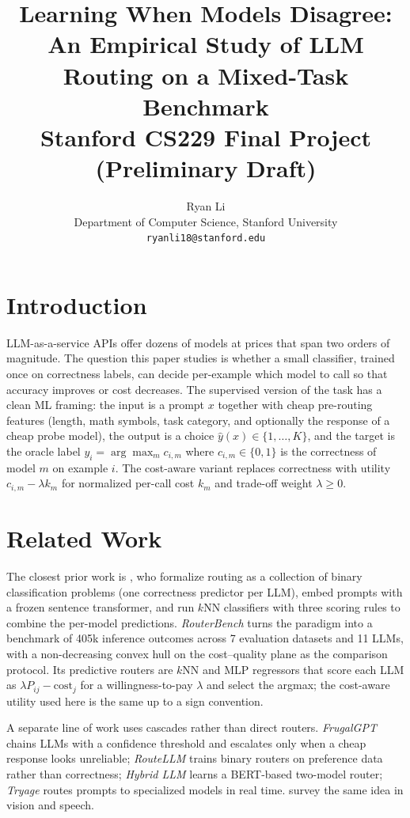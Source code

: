 \documentclass[11pt]{article}
\title{Learning When Models Disagree:\\ An Empirical Study of LLM Routing on a Mixed-Task Benchmark\\[0.3em] \large \normalfont Stanford CS229 Final Project (Preliminary Draft)}
\author{Ryan Li \\ Department of Computer Science, Stanford University \\ \texttt{ryanli18@stanford.edu}}
\date{}
\begin{document}
\maketitle

\section{Introduction}
LLM-as-a-service APIs offer dozens of models at prices that span two orders of magnitude. The question this paper studies is whether a small classifier, trained once on correctness labels, can decide per-example which model to call so that accuracy improves or cost decreases. The supervised version of the task has a clean ML framing: the input is a prompt $x$ together with cheap pre-routing features (length, math symbols, task category, and optionally the response of a cheap probe model), the output is a choice $\hat{y}(x)\in\{1,\dots,K\}$, and the target is the oracle label $y_i=\arg\max_m c_{i,m}$ where $c_{i,m}\in\{0,1\}$ is the correctness of model $m$ on example $i$. The cost-aware variant replaces correctness with utility $c_{i,m}-\lambda k_m$ for normalized per-call cost $k_m$ and trade-off weight $\lambda\geq 0$.

\section{Related Work}
The closest prior work is \citet{shnitzer2023llm}, who formalize routing as a collection of binary classification problems (one correctness predictor per LLM), embed prompts with a frozen sentence transformer, and run $k$NN classifiers with three scoring rules to combine the per-model predictions. \emph{RouterBench} \citep{routerbench} turns the paradigm into a benchmark of 405k inference outcomes across 7 evaluation datasets and 11 LLMs, with a non-decreasing convex hull on the cost--quality plane as the comparison protocol. Its predictive routers are $k$NN and MLP regressors that score each LLM as $\lambda P_{ij}-\mathrm{cost}_j$ for a willingness-to-pay $\lambda$ and select the argmax; the cost-aware utility used here is the same up to a sign convention.

A separate line of work uses cascades rather than direct routers. \emph{FrugalGPT} \citep{frugalgpt} chains LLMs with a confidence threshold and escalates only when a cheap response looks unreliable; \emph{RouteLLM} \citep{routellm} trains binary routers on preference data rather than correctness; \emph{Hybrid LLM} \citep{hybridllm} learns a BERT-based two-model router; \emph{Tryage} \citep{forcrouter} routes prompts to specialized models in real time. \citet{cascade_prior} survey the same idea in vision and speech.
\end{document}
